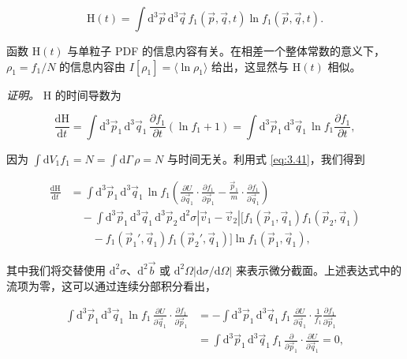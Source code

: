 \begin{equation}\label{eq:3.42}
  \mathrm{H}(t)=\int \mathrm{d}^3\vec p\,\mathrm{d}^3\vec q\,f_1(\vec p,\vec q,t)\ln f_1(\vec p,\vec q,t).
\end{equation}

函数 $\mathrm{H}(t)$ 与单粒子 PDF 的信息内容有关。在相差一个整体常数的意义下，$\rho_1=f_1/N$ 的信息内容由 $I[\rho_1]=\langle\ln\rho_1\rangle$ 给出，这显然与 $\mathrm{H}(t)$ 相似。

\emph{证明。} $\mathrm{H}$ 的时间导数为

\begin{equation}\label{eq:3.43}
  \frac{\mathrm{d}\mathrm{H}}{\mathrm{d}t}=\int \mathrm{d}^3\vec p_1\,\mathrm{d}^3\vec q_1\,\frac{\partial f_1}{\partial t}(\ln f_1+1)=\int \mathrm{d}^3\vec p_1\,\mathrm{d}^3\vec q_1\,\ln f_1\frac{\partial f_1}{\partial t},
\end{equation}

因为 $\int \mathrm{d}V_1f_1=N=\int \mathrm{d}\Gamma\,\rho=N$ 与时间无关。利用式 \eqref{eq:3.41}，我们得到

\begin{equation}\label{eq:3.44}
  \begin{aligned}
    \frac{\mathrm{d}\mathrm{H}}{\mathrm{d}t}&=\int \mathrm{d}^3\vec p_1\,\mathrm{d}^3\vec q_1\,\ln f_1\left(\frac{\partial U}{\partial\vec q_1}\cdot\frac{\partial f_1}{\partial\vec p_1}-\frac{\vec p_1}{m}\cdot\frac{\partial f_1}{\partial\vec q_1}\right)\\
    &\quad-\int \mathrm{d}^3\vec p_1\,\mathrm{d}^3\vec q_1\,\mathrm{d}^3\vec p_2\,\mathrm{d}^2\sigma|\vec v_1-\vec v_2|\Big[f_1(\vec p_1,\vec q_1)f_1(\vec p_2,\vec q_1)\\
    &\qquad-f_1(\vec p_1',\vec q_1)f_1(\vec p_2',\vec q_1)\Big]\ln f_1(\vec p_1,\vec q_1),
  \end{aligned}
\end{equation}

其中我们将交替使用 $\mathrm{d}^2\sigma$、$\mathrm{d}^2\vec b$ 或 $\mathrm{d}^2\Omega|\mathrm{d}\sigma/\mathrm{d}\Omega|$ 来表示微分截面。上述表达式中的流项为零，这可以通过连续分部积分看出，

\begin{equation*}
  \begin{aligned}
    \int \mathrm{d}^3\vec p_1\,\mathrm{d}^3\vec q_1\,\ln f_1\,\frac{\partial U}{\partial\vec q_1}\cdot\frac{\partial f_1}{\partial\vec p_1}&=-\int \mathrm{d}^3\vec p_1\,\mathrm{d}^3\vec q_1\,f_1\,\frac{\partial U}{\partial\vec q_1}\cdot\frac{1}{f_1}\frac{\partial f_1}{\partial\vec p_1}\\
    &=\int \mathrm{d}^3\vec p_1\,\mathrm{d}^3\vec q_1\,f_1\,\frac{\partial}{\partial\vec p_1}\cdot\frac{\partial U}{\partial\vec q_1}=0,
  \end{aligned}
\end{equation*}

